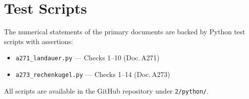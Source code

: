 \section*{Test Scripts}

The numerical statements of the primary documents are backed by Python test scripts
with assertions:
\begin{itemize}
  \item \texttt{a271\_landauer.py} --- Checks 1--10 (Doc.\,A271)
  \item \texttt{a273\_rechenkugel.py} --- Checks 1--14 (Doc.\,A273)
\end{itemize}
All scripts are available in the GitHub repository under \texttt{2/python/}.